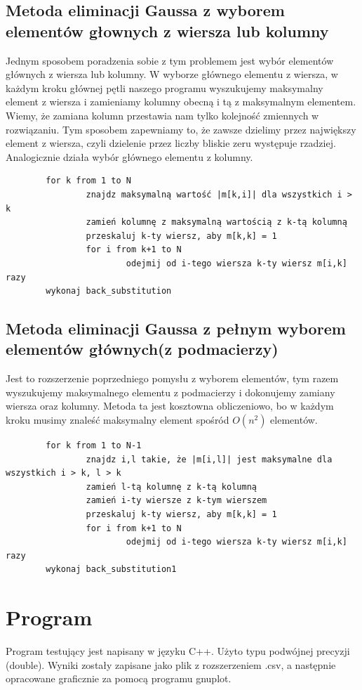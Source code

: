 \documentclass[a4paper,10pt]{article}
\begin{document}
\subsection{Metoda eliminacji Gaussa z wyborem elementów głownych z wiersza lub kolumny}
Jednym sposobem poradzenia sobie z tym problemem jest wybór elementów głównych z wiersza lub kolumny.
W wyborze głównego elementu z wiersza, w każdym kroku głównej pętli naszego programu wyszukujemy maksymalny element
z wiersza i zamieniamy kolumny obecną i tą z maksymalnym elementem. Wiemy, że zamiana kolumn przestawia nam tylko
kolejność zmiennych w rozwiązaniu. Tym sposobem zapewniamy to, że zawsze dzielimy przez największy element z wiersza,
czyli dzielenie przez liczby bliskie zeru występuje rzadziej. Analogicznie działa wybór głównego elementu z kolumny.
\begin{verbatim}
        for k from 1 to N
                znajdz maksymalną wartość |m[k,i]| dla wszystkich i > k
                zamień kolumnę z maksymalną wartością z k-tą kolumną
                przeskaluj k-ty wiersz, aby m[k,k] = 1
                for i from k+1 to N
                        odejmij od i-tego wiersza k-ty wiersz m[i,k] razy
        wykonaj back_substitution
\end{verbatim}

\subsection{Metoda eliminacji Gaussa z pełnym wyborem elementów głównych(z podmacierzy)}
Jest to rozszerzenie poprzedniego pomysłu z wyborem elementów, tym razem wyszukujemy maksymalnego elementu z podmacierzy i 
dokonujemy zamiany wiersza oraz kolumny. Metoda ta jest kosztowna obliczeniowo, bo w każdym kroku musimy znaleść maksymalny
element spośród $O(n^2)$ elementów.

\begin{verbatim}
        for k from 1 to N-1
                znajdz i,l takie, że |m[i,l]| jest maksymalne dla wszystkich i > k, l > k
                zamień l-tą kolumnę z k-tą kolumną
                zamień i-ty wiersze z k-tym wierszem
                przeskaluj k-ty wiersz, aby m[k,k] = 1
                for i from k+1 to N
                        odejmij od i-tego wiersza k-ty wiersz m[i,k] razy
        wykonaj back_substitution1
\end{verbatim}

\section{Program}
	Program testujący jest napisany w języku C++. Użyto typu podwójnej precyzji (double). Wyniki zostały zapisane jako plik z rozszerzeniem .csv, a następnie opracowane graficznie za pomocą programu gnuplot.
	
\end{document}
